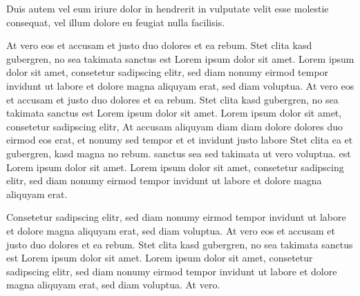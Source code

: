 \documentclass[]{../metanetpaper}
\begin{document}
\begin{Parallel}[c]{80mm}{80mm}
{    Duis autem vel eum iriure dolor in hendrerit in vulputate velit esse molestie consequat, vel illum dolore eu feugiat nulla facilisis.   

    At vero eos et accusam et justo duo dolores et ea rebum. Stet clita kasd gubergren, no sea takimata sanctus est Lorem ipsum dolor sit amet. Lorem ipsum dolor sit amet, consetetur sadipscing elitr, sed diam nonumy eirmod tempor invidunt ut labore et dolore magna aliquyam erat, sed diam voluptua. At vero eos et accusam et justo duo dolores et ea rebum. Stet clita kasd gubergren, no sea takimata sanctus est Lorem ipsum dolor sit amet. Lorem ipsum dolor sit amet, consetetur sadipscing elitr, At accusam aliquyam diam diam dolore dolores duo eirmod eos erat, et nonumy sed tempor et et invidunt justo labore Stet clita ea et gubergren, kasd magna no rebum. sanctus sea sed takimata ut vero voluptua. est Lorem ipsum dolor sit amet. Lorem ipsum dolor sit amet, consetetur sadipscing elitr, sed diam nonumy eirmod tempor invidunt ut labore et dolore magna aliquyam erat.   

    Consetetur sadipscing elitr, sed diam nonumy eirmod tempor invidunt ut labore et dolore magna aliquyam erat, sed diam voluptua. At vero eos et accusam et justo duo dolores et ea rebum. Stet clita kasd gubergren, no sea takimata sanctus est Lorem ipsum dolor sit amet. Lorem ipsum dolor sit amet, consetetur sadipscing elitr, sed diam nonumy eirmod tempor invidunt ut labore et dolore magna aliquyam erat, sed diam voluptua. At vero.
  }

\end{Parallel}
\end{document}
